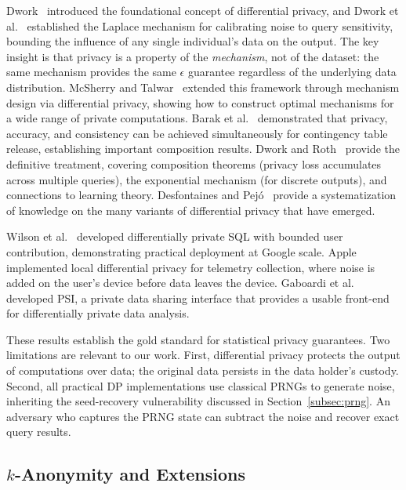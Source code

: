 \documentclass[journal]{IEEEtran}
\begin{document}
Dwork~\cite{dwork2006icalp} introduced the foundational concept of differential privacy, and Dwork et al.~\cite{dwork2006dp} established the Laplace mechanism for calibrating noise to query sensitivity, bounding the influence of any single individual's data on the output. The key insight is that privacy is a property of the \emph{mechanism}, not of the dataset: the same mechanism provides the same $\epsilon$ guarantee regardless of the underlying data distribution. McSherry and Talwar~\cite{mcsherry2007mechanism} extended this framework through mechanism design via differential privacy, showing how to construct optimal mechanisms for a wide range of private computations. Barak et al.~\cite{barak2007privacy} demonstrated that privacy, accuracy, and consistency can be achieved simultaneously for contingency table release, establishing important composition results. Dwork and Roth~\cite{dwork2014algfound} provide the definitive treatment, covering composition theorems (privacy loss accumulates across multiple queries), the exponential mechanism (for discrete outputs), and connections to learning theory. Desfontaines and Pej\'{o}~\cite{desfontaines2020sok} provide a systematization of knowledge on the many variants of differential privacy that have emerged.

Wilson et al.~\cite{wilson2020dpsql} developed differentially private SQL with bounded user contribution, demonstrating practical deployment at Google scale. Apple~\cite{apple2017dp} implemented local differential privacy for telemetry collection, where noise is added on the user's device before data leaves the device. Gaboardi et al.~\cite{gaboardi2016psi} developed PSI, a private data sharing interface that provides a usable front-end for differentially private data analysis.

These results establish the gold standard for statistical privacy guarantees. Two limitations are relevant to our work. First, differential privacy protects the output of computations over data; the original data persists in the data holder's custody. Second, all practical DP implementations use classical PRNGs to generate noise, inheriting the seed-recovery vulnerability discussed in Section~\ref{subsec:prng}. An adversary who captures the PRNG state can subtract the noise and recover exact query results.

\subsection{$k$-Anonymity and Extensions}
\label{subsec:kanon}
\end{document}

